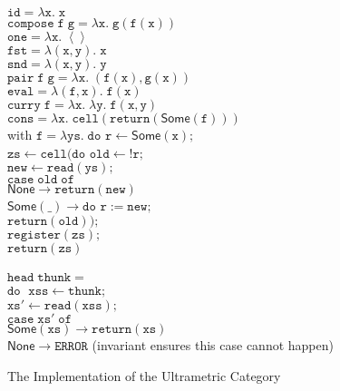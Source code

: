 \documentclass[preprint]{sigplanconf}
\newcommand{\term}[1]{\ensuremath{\mathtt{{#1}}}}
\newcommand{\unitval}{\left<\right>}
\newcommand{\None}{\mathsf{None}}
\newcommand{\Some}[1]{\mathsf{Some}({#1})}
\newcommand{\fun}[2]{\lambda {#1}.\;{#2}}
\begin{document}
\begin{figure}
\begin{tabbing}

\term{id = \fun{x}{x}} 
\\[1em]
\term{compose\;f\;g = \fun{x}{g(f(x))}}
\\[1em]
\term{one = \fun{x}{\unitval}}
\\[1em]
\term{fst = \fun{(x,y)}{x}}
\\[1em]
\term{snd = \fun{(x,y)}{y}}
\\[1em]
\term{pair\;f\;g = \fun{x}{(f(x),g(x))}}
\\[1em]
\term{eval = \fun{(f,x)}{f(x)}}
\\[1em]
\term{curry\;f = \fun{x}{\fun{y}{f(x,y)}}}
\\[1em]
\term{cons = \lambda x.\; cell(return(\Some{f}))} \\[0.1em]
with 
\term{f = \lambda ys.\;do} \= \term{r \leftarrow \Some{x};} \\
\>     \term{zs \leftarrow cell(}\= 
      \term{do} \=\term{old \leftarrow !r;} \\
\> \> \> \term{new \leftarrow read(ys);} \\
\> \> \> \term{case\;old\;of} \\
\> \> \> \;\;\= \term{\None \to return(new)} \\
\> \> \> \>     \term{\Some{\_} \to do} \=\term{r := new;} \\
\> \> \> \>  \>                           \term{return(old));} \\                 
\> \term{register(zs);} \\
\> \term{return(zs)}\\


\\
\term{head\;thunk =} \\
\;\;\term{do\;}
  \=\term{xss \leftarrow thunk;} \\
  \>\term{xs' \leftarrow read(xss);} \\
  \>\term{case\;xs'\;of} \\
  \>\;\;\=\term{\Some{xs} \to return(xs)}\\
  \>    \>\term{\None \to ERROR} (invariant ensures this case cannot happen)
\end{tabbing}
\caption{The Implementation of the Ultrametric Category}
\label{ultrametric-implementation}
\end{figure}
\end{document}
